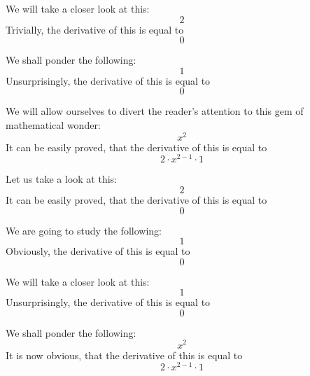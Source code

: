 \documentclass{article}
\begin{document}
We will take a closer look at this:
\begin{equation}
2 
\end{equation}
Trivially, the derivative of this is equal to
\begin{equation}
0 
\end{equation}

We shall ponder the following:
\begin{equation}
1 
\end{equation}
Unsurprisingly, the derivative of this is equal to
\begin{equation}
0 
\end{equation}

We will allow ourselves to divert the reader's attention to this gem of mathematical wonder:
\begin{equation}
x ^{2 } 
\end{equation}
It can be easily proved, that the derivative of this is equal to
\begin{equation}
2 \cdot x ^{2 - 1 } \cdot 1 
\end{equation}

Let us take a look at this:
\begin{equation}
2 
\end{equation}
It can be easily proved, that the derivative of this is equal to
\begin{equation}
0 
\end{equation}

We are going to study the following:
\begin{equation}
1 
\end{equation}
Obviously, the derivative of this is equal to
\begin{equation}
0 
\end{equation}

We will take a closer look at this:
\begin{equation}
1 
\end{equation}
Unsurprisingly, the derivative of this is equal to
\begin{equation}
0 
\end{equation}

We shall ponder the following:
\begin{equation}
x ^{2 } 
\end{equation}
It is now obvious, that the derivative of this is equal to
\begin{equation}
2 \cdot x ^{2 - 1 } \cdot 1 
\end{equation}
\end{document}
